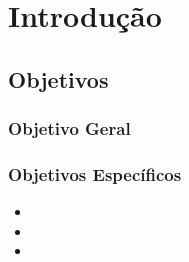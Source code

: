 
\chapter{Introdução}\label{ch:intro}


\section{Objetivos}\label{sec:objetivos}

\subsection{Objetivo Geral}\label{subsec:objetivo-geral}

\subsection{Objetivos Específicos}\label{subsec:objetivos-especificos}
\begin{itemize}

    \item
    \item
    \item

\end{itemize}
